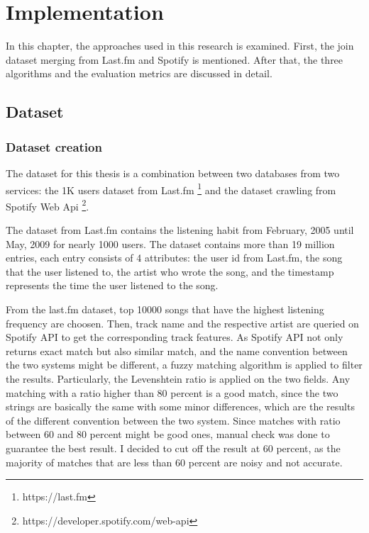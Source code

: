 \chapter{Implementation} %

\label{Chapter3} %

In this chapter, the approaches used in this research is examined. First, the join dataset merging from Last.fm and Spotify is mentioned. After that, the three algorithms and the evaluation metrics are discussed in detail.

\section{Dataset}

\subsection{Dataset creation}
The dataset for this thesis is a combination between two databases from two services: the 1K users dataset from Last.fm \footnote{https://last.fm} and the dataset crawling from Spotify Web Api \footnote{https://developer.spotify.com/web-api}. 

The dataset from Last.fm contains the listening habit from February, 2005 until May, 2009 for nearly 1000 users. The dataset contains more than 19 million entries, each entry consists of 4 attributes: the user id from Last.fm, the song that the user listened to, the artist who wrote the song, and the timestamp represents the time the user listened to the song. 

From the last.fm dataset, top 10000 songs that have the highest listening frequency are choosen. Then, track name and the respective artist are queried on Spotify API to get the corresponding track features. As Spotify API not only returns exact match but also similar match, and the name convention between the two systems might be different, a fuzzy matching algorithm is applied to filter the results. Particularly, the Levenshtein ratio is applied on the two fields. Any matching with a ratio higher than 80 percent is a good match, since the two strings are basically the same with some minor differences, which are the results of the different convention between the two system. Since matches with ratio between 60 and 80 percent might be good ones, manual check was done to guarantee the best result. I decided to cut off the result at 60 percent, as the majority of matches that are less than 60 percent are noisy and not accurate.

